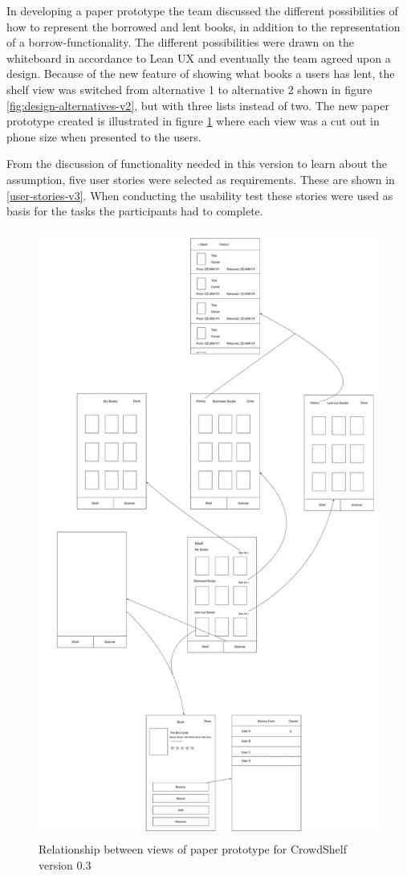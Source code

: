 In developing a paper prototype the team discussed the different possibilities of how to represent the borrowed and lent books, in addition to the representation of a borrow-functionality. The different possibilities were drawn on the whiteboard in accordance to Lean UX and eventually the team agreed upon a design. Because of the new feature of showing what books a users has lent, the shelf view was switched from alternative 1 to alternative 2 shown in figure \ref{fig:design-alternatives-v2}, but with three lists instead of two. The new paper prototype created is illustrated in figure \ref{fig:prototype-v3} where each view was a cut out in phone size when presented to the users. 

From the discussion of functionality needed in this version to learn about the assumption, five user stories were selected as requirements. These are shown in \ref{user-stories-v3}. When conducting the usability test these stories were used as basis for the tasks the participants had to complete. 

\begin{figure}
\centering
\includegraphics[height=20cm]{figs/v03/prototypesv3.jpg}
\caption{Relationship between views of paper prototype for CrowdShelf version 0.3}

\label{fig:prototype-v3}
\end{figure}

